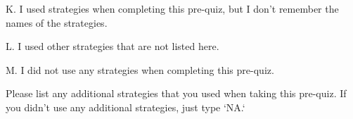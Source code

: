 \documentclass{ximera}
\begin{document}
\begin{question}
\begin{question}
\end{question}
\begin{question}
    
    K. I used strategies when completing this pre-quiz, but I don't remember the names of the strategies.

    \begin{multipleChoice}
    \end{multipleChoice}
    
\end{question}
\begin{question}
    
    L. I used other strategies that are not listed here.

    \begin{multipleChoice}
    \end{multipleChoice}
    
\end{question}
\begin{question}
    
    M. I did not use any strategies when completing this pre-quiz.

    \begin{multipleChoice}
    \end{multipleChoice}
    
\end{question}
\end{question}

\begin{question}
    Please list any additional strategies that you used when taking this pre-quiz. If you didn't use any additional strategies, just type `NA.`
   \begin{freeResponse}
   \end{freeResponse}
\end{question}



\end{document}
